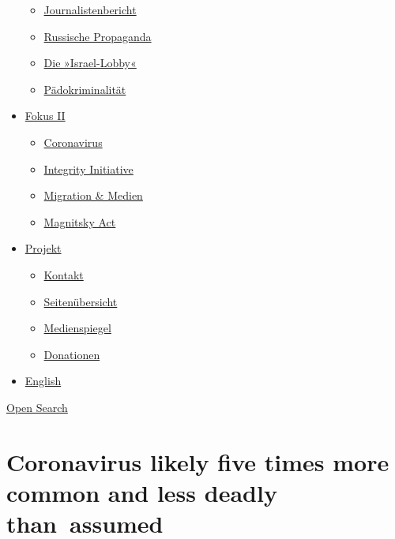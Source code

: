 \begin{itemize}
  \begin{itemize}
  \tightlist
  \item
    \href{https://swprs.org/bericht-eines-journalisten/}{Journalistenbericht}
  \item
    \href{https://swprs.org/russische-propaganda/}{Russische Propaganda}
  \item
    \href{https://swprs.org/die-israel-lobby-fakten-und-mythen/}{Die
    »Israel-Lobby«}
  \item
    \href{https://swprs.org/geopolitik-und-paedokriminalitaet/}{Pädokriminalität}
  \end{itemize}
\item
  \href{https://swprs.org/migration-und-medien/}{Fokus II}

  \begin{itemize}
  \tightlist
  \item
    \href{https://swprs.org/covid-19-hinweis-ii/}{Coronavirus}
  \item
    \href{https://swprs.org/die-integrity-initiative/}{Integrity
    Initiative}
  \item
    \href{https://swprs.org/migration-und-medien/}{Migration \& Medien}
  \item
    \href{https://swprs.org/der-fall-magnitsky/}{Magnitsky Act}
  \end{itemize}
\item
  \href{https://swprs.org/kontakt/}{Projekt}

  \begin{itemize}
  \tightlist
  \item
    \href{https://swprs.org/kontakt/}{Kontakt}
  \item
    \href{https://swprs.org/uebersicht/}{Seitenübersicht}
  \item
    \href{https://swprs.org/medienspiegel/}{Medienspiegel}
  \item
    \href{https://swprs.org/donationen/}{Donationen}
  \end{itemize}
\item
  \href{https://swprs.org/contact/}{English}
\end{itemize}

\protect\hyperlink{}{Open Search}

\hypertarget{coronavirus-likely-five-times-more-common-and-less-deadly-than-assumed}{%
\section{Coronavirus likely five times more common and less deadly
than~assumed}\label{coronavirus-likely-five-times-more-common-and-less-deadly-than-assumed}}

